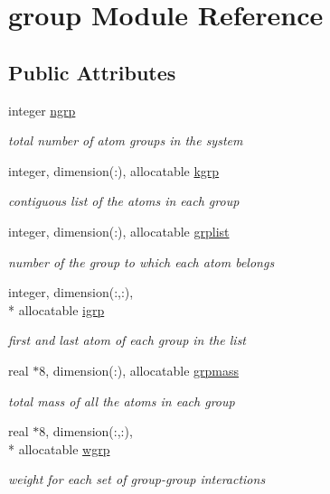 \hypertarget{classgroup}{\section{group Module Reference}
\label{classgroup}
}
\subsection*{Public Attributes}
\begin{DoxyCompactItemize}
\item 
integer \hyperlink{classgroup_a00f7ad6b69b8e16f0338402c11bce2ad}{ngrp}
\begin{DoxyCompactList}\small\item\em total number of atom groups in the system \end{DoxyCompactList}\item 
integer, dimension(\-:), allocatable \hyperlink{classgroup_a4234ee36c99f383d0a54c4a2718bc659}{kgrp}
\begin{DoxyCompactList}\small\item\em contiguous list of the atoms in each group \end{DoxyCompactList}\item 
integer, dimension(\-:), allocatable \hyperlink{classgroup_a84fbebdd56f12ecc9b43b0091703fabb}{grplist}
\begin{DoxyCompactList}\small\item\em number of the group to which each atom belongs \end{DoxyCompactList}\item 
integer, dimension(\-:,\-:), \\*
allocatable \hyperlink{classgroup_ac4dd0d4e5c4885c1cb77e954925ef324}{igrp}
\begin{DoxyCompactList}\small\item\em first and last atom of each group in the list \end{DoxyCompactList}\item 
real $\ast$8, dimension(\-:), allocatable \hyperlink{classgroup_ab354edd30c1396b9376acf9100fd63d3}{grpmass}
\begin{DoxyCompactList}\small\item\em total mass of all the atoms in each group \end{DoxyCompactList}\item 
real $\ast$8, dimension(\-:,\-:), \\*
allocatable \hyperlink{classgroup_a8ec57c3684dfb8d832c612fb2d67bfa0}{wgrp}
\begin{DoxyCompactList}\small\item\em weight for each set of group-\/group interactions \end{DoxyCompactList}\item 

\end{DoxyCompactItemize}
